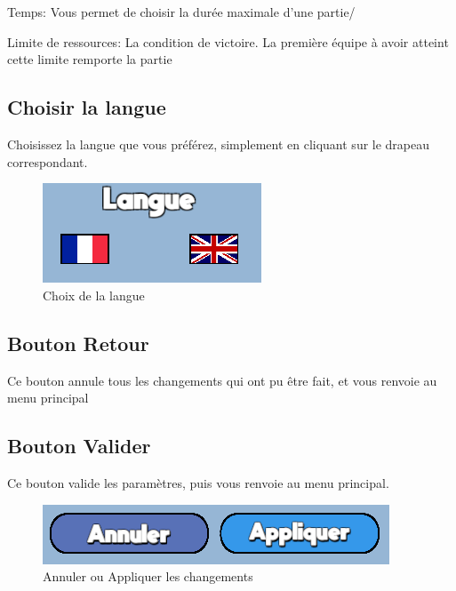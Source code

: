 \documentclass{report}
\begin{document}
Temps: \newline
Vous permet de choisir la durée maximale d’une partie/\newline

Limite de ressources:\newline
La condition de victoire. La première équipe à avoir atteint cette limite remporte la partie

\subsection{Choisir la langue}
Choisissez la langue que vous préférez, simplement en cliquant sur le drapeau correspondant.
\begin{figure}[!h]
	\centering
		\includegraphics[scale=0.80]{Choix_Langue}
	\caption{Choix de la langue}
\end{figure}


\subsection{Bouton Retour}
Ce bouton annule tous les changements qui ont pu être fait, et vous renvoie au menu principal
\subsection{Bouton Valider}
Ce bouton valide les paramètres, puis vous renvoie au menu principal.
\begin{figure}[!h]
	\centering
		\includegraphics[scale=0.80]{ApplyCancelSettings}
	\caption{Annuler ou Appliquer les changements}
\end{figure}
\clearpage
\end{document}
